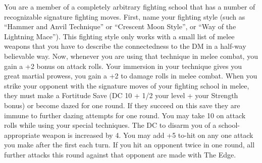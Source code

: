 {You are a member of a completely arbitrary fighting school that has a number of recognizable signature fighting moves.}
{First, name your fighting style (such as ``Hammer and Anvil Technique'' or ``Crescent Moon Style'', or ``Way of the Lightning Mace''). This fighting style only works with a small list of melee weapons that you have to describe the connectedness to the DM in a half-way believable way. Now, whenever you are using that technique in melee combat, you gain a +2 bonus on attack rolls.}
{Your immersion in your technique gives you great martial prowess, you gain a +2 to damage rolls in melee combat.}
{When you strike your opponent with the signature moves of your fighting school in melee, they must make a Fortitude Save (DC 10 + 1/2 your level + your Strength bonus) or become dazed for one round. If they succeed on this save they are immune to further dazing attempts for one round.}
{You may take 10 on attack rolls while using your special techniques. The DC to disarm you of a school-appropriate weapon is increased by 4.}
{You may add +5 to-hit on any one attack you make after the first each turn. If you hit an opponent twice in one round, all further attacks this round against that opponent are made with The Edge.}
